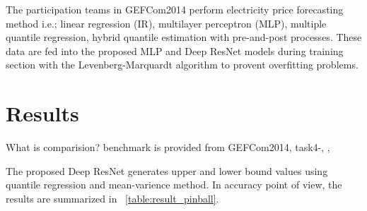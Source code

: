 \documentclass[review]{elsarticle}
\begin{document}
      The participation teams in GEFCom2014 perform electricity price forecasting method i.e.; linear regression (IR)\cite{Dudek2016}, multilayer perceptron (MLP)\cite{Dudek2016},  multiple quantile regression\cite{Juban2016}, hybrid quantile estimation with pre-and-post processes\cite{Maciejowska2016}.
      These data are fed into the proposed MLP and Deep ResNet models during training section with the Levenberg-Marquardt algorithm to provent overfitting problems.
  \section{Results}
    What is comparision? benchmark is provided from GEFCom2014, task4-\cite{Dudek2016}, \cite{Maciejowska2016}, \cite{Khosravi2011}

    The proposed Deep ResNet generates upper and lower bound values using quantile regression and mean-varience method.
    In accuracy point of view, the results are summarized in ~\ref{table:result_pinball}.
\end{document}
